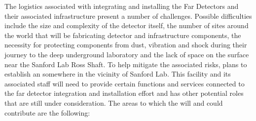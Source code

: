 The logistics associated with integrating and installing the
 Far Detectors and their associated infrastructure present
a number of challenges. Possible difficulties include the size and
complexity of the detector itself, the number of sites around the
world that will be fabricating detector and infrastructure components,
the necessity for protecting components from dust, vibration and shock
during their journey to the deep underground laboratory and the lack
of space on the surface near the Sanford Lab Ross Shaft. To help
mitigate the associated risks,  plans to establish an
 somewhere in the vicinity of Sanford Lab. This facility
and its associated staff will need to provide certain functions and
services connected to the  far detector integration and
installation effort and has other potential roles that are still under
consideration.  The areas to which the  will and could
contribute are the following:
